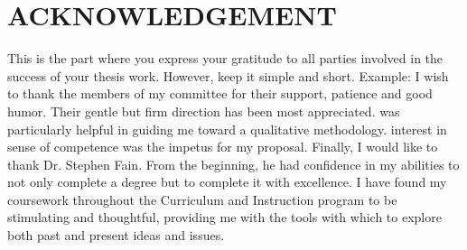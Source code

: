 
\chapter*{ACKNOWLEDGEMENT}
\thispagestyle{fancy}
This is the part where you express your gratitude to all parties involved in the success of your thesis work. However, keep it simple and short. 
Example: I wish to thank the members of my committee for their support, patience and good humor. Their gentle but firm direction has been most appreciated. \ADVISOR was particularly helpful in guiding me toward a qualitative methodology. \COADVISOR interest in sense of competence was the impetus for my proposal. Finally, I would like to thank Dr. Stephen Fain. From the beginning, he had confidence in my abilities to not only complete a degree but to complete it with excellence.
I have found my coursework throughout the Curriculum and Instruction program to be stimulating and thoughtful, providing me with the tools with which to explore both past and present ideas and issues.


